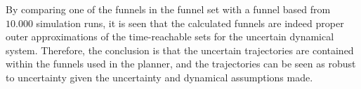 By comparing one of the funnels in the funnel set with a funnel based from
\(10.000\) simulation runs, it is seen that the calculated funnels are indeed
proper outer approximations of the time-reachable sets for the uncertain
dynamical system. Therefore, the conclusion is that the uncertain trajectories
are contained within the funnels used in the planner, and the trajectories can
be seen as robust to uncertainty given the uncertainty and dynamical assumptions
made.


